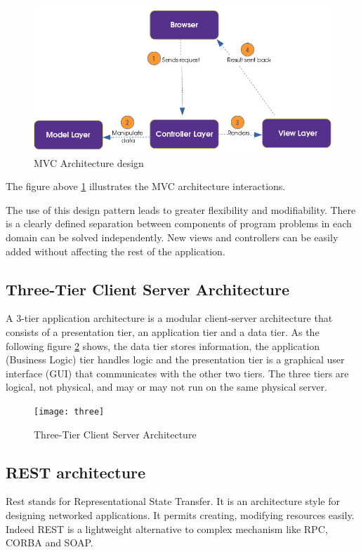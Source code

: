 \begin{figure}[htbp!]
  \center
  \includegraphics[width=16cm]{mvc_fig}
  \caption{MVC Architecture design}
  \label{fig:mvc_fig}
\end{figure}
The figure above \hyperref[fig:mvc_fig]{\ref{fig:mvc_fig}}  illustrates the MVC architecture interactions.

The use of this design pattern leads to greater flexibility and modifiability.
There is a clearly defined separation between components of program problems in each domain can be solved independently.
New views and controllers can be easily added without affecting the rest of the application.


\subsection{Three-Tier Client Server Architecture}
A 3-tier application architecture is a modular client-server architecture that consists of a presentation tier, an application tier and a data tier. As the following figure \hyperref[fig:three]{\ref{fig:three}}  shows, the data tier stores information, the application (Business Logic) tier handles logic and the presentation tier is a graphical user interface (GUI) that communicates with the other two tiers. The three tiers are logical, not physical, and may or may not run on the same physical server.\cite{three}
\begin{figure}[h]
  \center
  \texttt{[image: three]}
  \caption{Three-Tier Client Server Architecture}
  \label{fig:three}
\end{figure}

\subsection{REST architecture}
Rest stands for Representational State Transfer. It is an architecture style for designing
networked applications. It permits creating, modifying resources easily. Indeed REST is a
lightweight alternative to complex mechanism like RPC, CORBA and SOAP.

